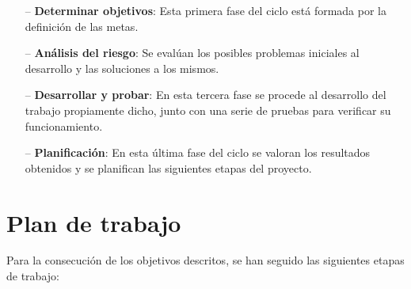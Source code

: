 \begin{itemize}
	\item[--] \textbf{Determinar objetivos}: Esta primera fase del ciclo está formada por la definición de las metas.
	\item[--] \textbf{Análisis del riesgo}: Se evalúan los posibles problemas iniciales al desarrollo y las soluciones a los mismos.
	\item[--] \textbf{Desarrollar y probar}: En esta tercera fase se procede al desarrollo del trabajo propiamente dicho, junto con una serie de pruebas para verificar su funcionamiento.
	\item[--] \textbf{Planificación}: En esta última fase del ciclo se valoran los resultados obtenidos y se planifican las siguientes etapas del proyecto.
\end{itemize}

\section{Plan de trabajo}
Para la consecución de los objetivos descritos, se han seguido las siguientes etapas de trabajo:

